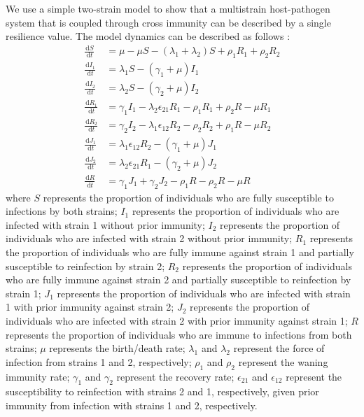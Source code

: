 \documentclass[12pt]{article}
\newcommand{\dd}[1]{\ensuremath{\, \mathrm{d}#1}}
\begin{document}
We use a simple two-strain model to show that a multistrain host-pathogen system that is coupled through cross immunity can be described by a single resilience value.
The model dynamics can be described as follows \citep{bhattacharyya2015cross}: 
\begin{align}
\frac{\dd S}{\dd t} &= \mu - \mu S - (\lambda_1 + \lambda_2) S + \rho_1 R_1 + \rho_2 R_2 \\
\frac{\dd I_1}{\dd t} &= \lambda_1 S - (\gamma_1 + \mu) I_1 \\
\frac{\dd I_2}{\dd t} &= \lambda_2 S - (\gamma_2 + \mu) I_2 \\
\frac{\dd R_1}{\dd t} &= \gamma_1 I_1 - \lambda_2 \epsilon_{21} R_1 - \rho_1 R_1 + \rho_2 R - \mu R_1\\
\frac{\dd R_2}{\dd t} &= \gamma_2 I_2 - \lambda_1 \epsilon_{12} R_2 - \rho_2 R_2 + \rho_1 R - \mu R_2\\
\frac{\dd J_1}{\dd t} &= \lambda_1 \epsilon_{12} R_2 - (\gamma_1 + \mu) J_1\\
\frac{\dd J_2}{\dd t} &= \lambda_2 \epsilon_{21} R_1 - (\gamma_2 + \mu) J_2\\
\frac{\dd R}{\dd t} &= \gamma_1 J_1 + \gamma_2 J_2 - \rho_1 R - \rho_2 R - \mu R
\end{align}
where $S$ represents the proportion of individuals who are fully susceptible to infections by both strains;
$I_1$ represents the proportion of individuals who are infected with strain 1 without prior immunity;
$I_2$ represents the proportion of individuals who are infected with strain 2 without prior immunity;
$R_1$ represents the proportion of individuals who are fully immune against strain 1 and partially susceptible to reinfection by strain 2;
$R_2$ represents the proportion of individuals who are fully immune against strain 2 and partially susceptible to reinfection by strain 1;
$J_1$ represents the proportion of individuals who are infected with strain 1 with prior immunity against strain 2;
$J_2$ represents the proportion of individuals who are infected with strain 2 with prior immunity against strain 1;
$R$ represents the proportion of individuals who are immune to infections from both strains;
$\mu$ represents the birth/death rate;
$\lambda_1$ and $\lambda_2$ represent the force of infection from strains 1 and 2, respectively;
$\rho_1$ and $\rho_2$ represent the waning immunity rate;
$\gamma_1$ and $\gamma_2$ represent the recovery rate;
$\epsilon_{21}$ and $\epsilon_{12}$ represent the susceptibility to reinfection with strains 2 and 1, respectively, given prior immunity from infection with strains 1 and 2, respectively. 
\end{document}
